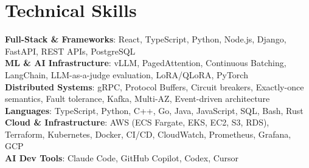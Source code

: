 \documentclass[letterpaper,11pt]{article}
\begin{document}
\section{Technical Skills}
\vspace{-7pt}
\begin{itemize}
[leftmargin=0.15in, label={}]\small{\item{
        \textbf{Full-Stack \& Frameworks}{: React, TypeScript, Python, Node.js, Django, FastAPI, REST APIs, PostgreSQL} \\
        \textbf{ML \& AI Infrastructure}{: vLLM, PagedAttention, Continuous Batching, LangChain, LLM-as-a-judge evaluation, LoRA/QLoRA, PyTorch} \\
        \textbf{Distributed Systems}{: gRPC, Protocol Buffers, Circuit breakers, Exactly-once semantics, Fault tolerance, Kafka, Multi-AZ, Event-driven architecture} \\
        \textbf{Languages}{: TypeScript, Python, C++, Go, Java, JavaScript, SQL, Bash, Rust} \\
        \textbf{Cloud \& Infrastructure}{: AWS (ECS Fargate, EKS, EC2, S3, RDS), Terraform, Kubernetes, Docker, CI/CD, CloudWatch, Prometheus, Grafana, GCP} \\
        \textbf{AI Dev Tools}{: Claude Code, GitHub Copilot, Codex, Cursor} \\
}}
\end{itemize}
\end{document}
